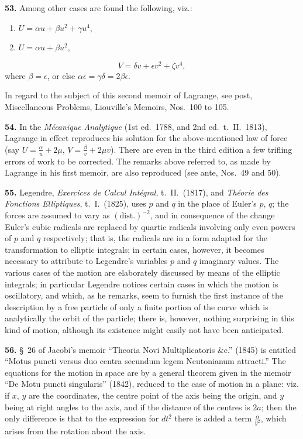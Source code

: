 \documentclass[11pt,a4paper]{book}
\begin{document}
\textbf{53.} Among other cases are found the following, viz.:
\begin{enumerate}[label=\arabic*.]
    \item $U = \alpha u + \beta u^2 + \gamma u^4$,
    \item $U = \alpha u + \beta u^2$,
\end{enumerate}
\[
V = \delta v + \epsilon v^2 + \zeta v^4,
\]
where $\beta = \epsilon$, or else $\alpha\epsilon = \gamma\delta = 2\beta\epsilon$.

In regard to the subject of this second memoir of Lagrange, see post, Miscellaneous Problems, Liouville's Memoirs, Nos.~100 to 105.

\textbf{54.} In the \textit{M\'ecanique Analytique} (1st ed.~1788, and 2nd ed.~t.~II.~1813), Lagrange in effect reproduces his solution for the above-mentioned law of force (say $U = \frac{\alpha}{u} + 2\mu$, $V = \frac{\beta}{v} + 2\mu v$). There are even in the third edition a few trifling errors of work to be corrected. The remarks above referred to, as made by Lagrange in his first memoir, are also reproduced (see ante, Nos.~49 and 50).

\textbf{55.} Legendre, \textit{Exercices de Calcul Int\'egral}, t.~II.~(1817), and \textit{Th\'eorie des Fonctions Elliptiques}, t.~I.~(1825), uses $p$ and $q$ in the place of Euler's $p$, $q$; the forces are assumed to vary as $(\text{dist.})^{-2}$, and in consequence of the change Euler's cubic radicals are replaced by quartic radicals involving only even powers of $p$ and $q$ respectively; that is, the radicals are in a form adapted for the transformation to elliptic integrals; in certain cases, however, it becomes necessary to attribute to Legendre's variables $p$ and $q$ imaginary values. The various cases of the motion are elaborately discussed by means of the elliptic integrals; in particular Legendre notices certain cases in which the motion is oscillatory, and which, as he remarks, seem to furnish the first instance of the description by a free particle of only a finite portion of the curve which is analytically the orbit of the particle; there is, however, nothing surprising in this kind of motion, although its existence might easily not have been anticipated.

\textbf{56.} \S~26 of Jacobi's memoir ``Theoria Novi Multiplicatoris \&c.'' (1845) is entitled ``Motus puncti versus duo centra secundum legem Neutonianum attracti.'' The equations for the motion in space are by a general theorem given in the memoir ``De Motu puncti singularis'' (1842), reduced to the case of motion in a plane: viz. if $x$, $y$ are the coordinates, the centre point of the axis being the origin, and $y$ being at right angles to the axis, and if the distance of the centres is $2a$; then the only difference is that to the expression for $dt^2$ there is added a term $\frac{\alpha}{y^2}$, which arises from the rotation about the axis.
\end{document}
